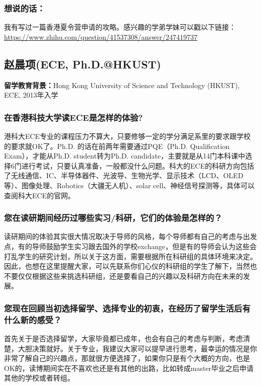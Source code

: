\documentclass[a4paper,UTF8]{book}
\begin{document}
    \subsubsection{想说的话：}
    我有写过一篇香港夏令营申请的攻略。感兴趣的学弟学妹可以戳以下链接：\\
    \url{https://www.zhihu.com/question/41537308/answer/247419737}
    


\clearpage
\subsection{赵晨项(ECE, Ph.D.@HKUST)}
    \textbf{留学教育背景：}Hong Kong University of Science and Technology (HKUST), ECE, 2013年入学

    \subsubsection*{在香港科技大学读ECE是怎样的体验?}
    港科大ECE专业的课程压力不算大，只要修够一定的学分满足系里的要求跟学校的要求就OK了。Ph.D. 的话在前两年需要通过PQE（Ph.D. Qualification Exam），才能从Ph.D. student转为Ph.D. candidate，主要就是从14门本科课中选择6门进行考试，只要认真准备，一般都没什么问题。科大的ECE的科研方向包括了无线通信、IC、半导体器件、光波导、生物光学、显示技术（LCD、OLED等）、图像处理、Robotics（大疆无人机）、solar cell、神经信号探测等，具体可以查阅科大ECE的官网。

    \subsubsection*{您在读研期间经历过哪些实习/科研，它们的体验是怎样的？}
    读研期间的体验其实很大情况取决于导师的风格，每个导师都有自己的考虑与出发点，有的导师鼓励学生实习跟去国外的学校exchange，但是有的导师会认为这些会打乱学生的研究计划，所以关于这方面，需要根据所在科研组的具体环境来决定。因此，也想在这里提醒大家，可以先联系你们心仪的科研组的学生了解下，当然也不要仅仅根据这些来挑选科研组，还是要看自己的兴趣以及科研方向在未来的发展。

    \subsubsection*{您现在回顾当初选择留学、选择专业的初衷，在经历了留学生活后有什么新的感受？}
    首先关于是否选择留学，大家毕竟都已成年，也会有自己的考虑与判断，考虑清楚，大胆决策就好。关于专业，我建议大家可以提早进行思考，最幸运的情况是你非常了解自己的兴趣点，那就很方便选择了，如果你只是有个大概的方向，也是OK的，读博期间实在不喜欢也还是有其他的出路，比如转成master毕业之后申请其他的学校或者转组。
\end{document}

